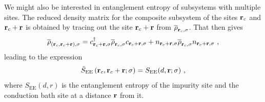 \documentclass[reprint,hidelinks]{revtex4-2}
\begin{document}
We might also be interested in entanglement entropy of subsystems with multiple sites. The reduced density matrix for the composite subsystem of the sites \({\bf r}_c\) and \({\bf r}_c + {\bf r}\) is obtained by tracing out the site \({\bf r}_c + {\bf r}\) from \(\overline\rho_{{\bf r}_c,\sigma}\). That then gives
\begin{equation}\begin{aligned}
	\overline\rho_{({\bf r}_c, {\bf r}_c + {\bf r}),\sigma} = c^\dagger_{{\bf r}_c + {\bf r},\sigma} \overline\rho_{{\bf r}_c,\sigma} c_{{\bf r}_c + {\bf r},\sigma} + n_{{\bf r}_c + {\bf r},\sigma} \overline\rho_{{\bf r}_c,\sigma} n_{{\bf r}_c + {\bf r},\sigma}~,
\end{aligned}\end{equation}
leading to the expression
\begin{equation}\begin{aligned}
	\tilde S_\text{EE}\left({\bf r}_c, {\bf r}_c + {\bf r};\sigma\right) = S_\text{EE}(d, {\bf r};\sigma)~,
\end{aligned}\end{equation}
where \(S_\text{EE}(d, r)\) is the entanglement entropy of the impurity site and the conduction bath site at a distance \({\bf r}\) from it.
\end{document}
